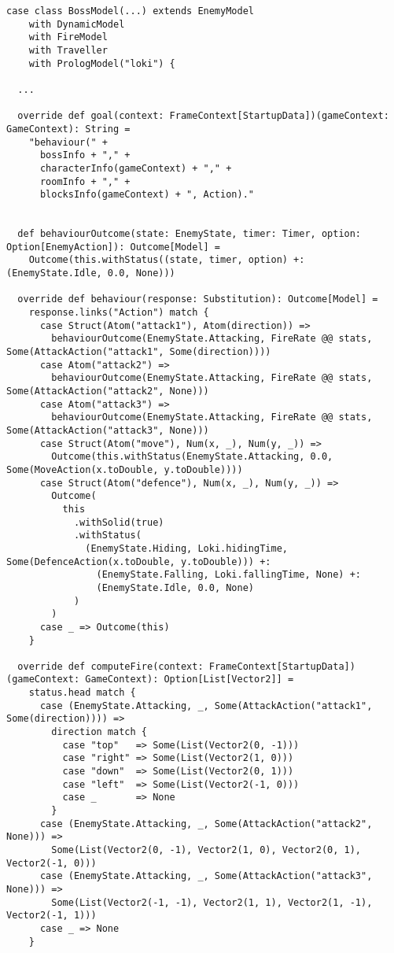 \begin{lstlisting}[basicstyle=\tiny]
case class BossModel(...) extends EnemyModel
    with DynamicModel
    with FireModel
    with Traveller
    with PrologModel("loki") {

  ...

  override def goal(context: FrameContext[StartupData])(gameContext: GameContext): String =
    "behaviour(" +
      bossInfo + "," +
      characterInfo(gameContext) + "," +
      roomInfo + "," +
      blocksInfo(gameContext) + ", Action)."

  
  def behaviourOutcome(state: EnemyState, timer: Timer, option: Option[EnemyAction]): Outcome[Model] =
    Outcome(this.withStatus((state, timer, option) +: (EnemyState.Idle, 0.0, None)))

  override def behaviour(response: Substitution): Outcome[Model] =
    response.links("Action") match {
      case Struct(Atom("attack1"), Atom(direction)) =>
        behaviourOutcome(EnemyState.Attacking, FireRate @@ stats, Some(AttackAction("attack1", Some(direction))))
      case Atom("attack2") =>
        behaviourOutcome(EnemyState.Attacking, FireRate @@ stats, Some(AttackAction("attack2", None)))
      case Atom("attack3") =>
        behaviourOutcome(EnemyState.Attacking, FireRate @@ stats, Some(AttackAction("attack3", None)))
      case Struct(Atom("move"), Num(x, _), Num(y, _)) =>
        Outcome(this.withStatus(EnemyState.Attacking, 0.0, Some(MoveAction(x.toDouble, y.toDouble))))
      case Struct(Atom("defence"), Num(x, _), Num(y, _)) =>
        Outcome(
          this
            .withSolid(true)
            .withStatus(
              (EnemyState.Hiding, Loki.hidingTime, Some(DefenceAction(x.toDouble, y.toDouble))) +:
                (EnemyState.Falling, Loki.fallingTime, None) +:
                (EnemyState.Idle, 0.0, None)
            )
        )
      case _ => Outcome(this)
    }

  override def computeFire(context: FrameContext[StartupData])(gameContext: GameContext): Option[List[Vector2]] =
    status.head match {
      case (EnemyState.Attacking, _, Some(AttackAction("attack1", Some(direction)))) =>
        direction match {
          case "top"   => Some(List(Vector2(0, -1)))
          case "right" => Some(List(Vector2(1, 0)))
          case "down"  => Some(List(Vector2(0, 1)))
          case "left"  => Some(List(Vector2(-1, 0)))
          case _       => None
        }
      case (EnemyState.Attacking, _, Some(AttackAction("attack2", None))) =>
        Some(List(Vector2(0, -1), Vector2(1, 0), Vector2(0, 1), Vector2(-1, 0)))
      case (EnemyState.Attacking, _, Some(AttackAction("attack3", None))) =>
        Some(List(Vector2(-1, -1), Vector2(1, 1), Vector2(1, -1), Vector2(-1, 1)))
      case _ => None
    }


\end{lstlisting}
